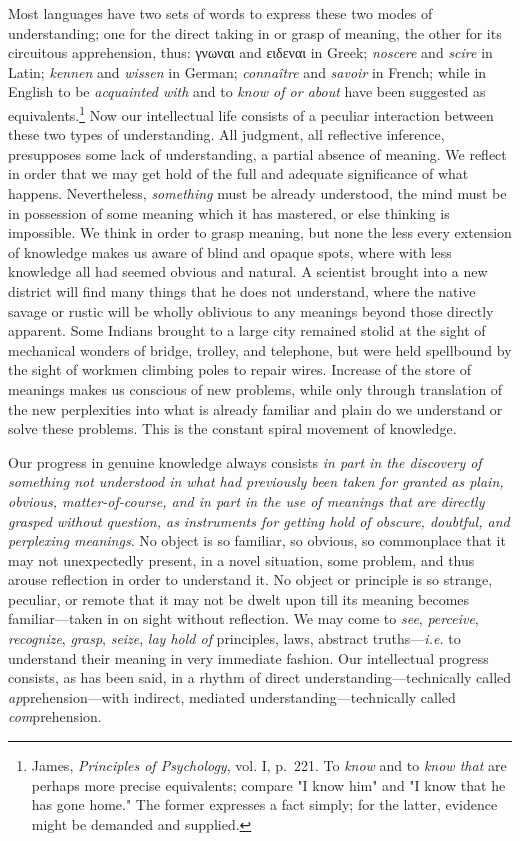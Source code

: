 \documentclass[showtrims,ustradepaper]{memoir}
\begin{document}
Most languages have two sets of words to express these two modes of
understanding; one for the direct taking in or grasp of meaning, the
other for its circuitous apprehension, thus: \textgreek{γνωναι} and
\textgreek{ειδεναι} in Greek; \emph{noscere} and \emph{scire} in Latin;
\emph{kennen} and \emph{wissen} in German; \emph{connaître} and
\emph{savoir} in French; while in English to be \emph{acquainted with}
and to \emph{know of or about} have been suggested as
equivalents.\footnote{
James, \emph{Principles of Psychology}, vol. I, p.\ 221. To \emph{know}
and to \emph{know that} are perhaps more precise equivalents; compare "I
know him" and "I know that he has gone home." The former expresses a
fact simply; for the latter, evidence might be demanded and supplied.
}
Now our intellectual life consists of a peculiar interaction between
these two types of understanding. All judgment, all reflective
inference, presupposes some lack of understanding, a partial absence of
meaning. We reflect in order that we may get hold of the full and
adequate significance of what happens. Nevertheless, \emph{something}
must be already understood, the mind must be in possession of some
meaning which it has mastered, or else thinking is impossible. We think
in order to grasp meaning, but none the less every extension of
knowledge makes us aware of blind and opaque spots, where with less
knowledge all had seemed obvious and natural. A scientist brought into a
new district will find many things that he does not understand, where
the native savage
or
rustic will be wholly oblivious to any meanings beyond those directly
apparent. Some Indians brought to a large city remained stolid at the
sight of mechanical wonders of bridge, trolley, and telephone, but were
held spellbound by the sight of workmen climbing poles to repair wires.
Increase of the store of meanings makes us conscious of new problems,
while only through translation of the new perplexities into what is
already familiar and plain do we understand or solve these problems.
This is the constant spiral movement of knowledge.


Our progress in genuine knowledge always consists \emph{in part in the
discovery of something not understood in what had previously been taken
for granted as plain, obvious, matter-of-course, and in part in the use
of meanings that are directly grasped without question, as instruments
for getting hold of obscure, doubtful, and perplexing meanings}. No
object is so familiar, so obvious, so commonplace that it may not
unexpectedly present, in a novel situation, some problem, and thus
arouse reflection in order to understand it. No object or principle is
so strange, peculiar, or remote that it may not be dwelt upon till its
meaning becomes familiar---taken in on sight without reflection. We may
come to \emph{see}, \emph{perceive}, \emph{recognize}, \emph{grasp},
\emph{seize}, \emph{lay hold of} principles, laws, abstract
truths---\emph{i.e.} to understand their meaning in very immediate
fashion. Our intellectual progress consists, as has been said, in a
rhythm of direct understanding---technically called
\emph{ap}prehension---with indirect, mediated
understanding---technically called \emph{com}prehension.
\end{document}
